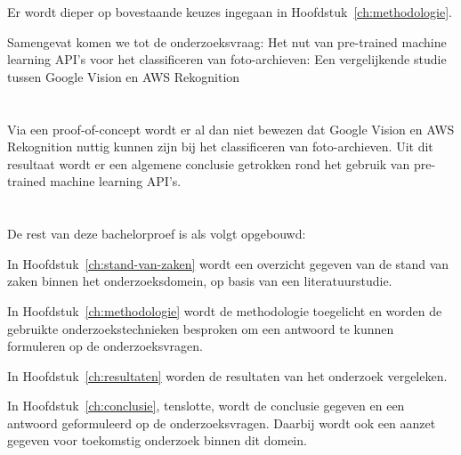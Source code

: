 Er wordt dieper op bovestaande keuzes ingegaan in Hoofdstuk~\ref{ch:methodologie}.

Samengevat komen we tot de onderzoeksvraag: Het nut van pre-trained machine learning API's voor het classificeren van foto-archieven: Een vergelijkende studie tussen Google Vision en AWS Rekognition

\section{}
\label{sec:onderzoeksdoelstelling}

Via een proof-of-concept wordt er al dan niet bewezen dat Google Vision en AWS Rekognition nuttig kunnen zijn bij het classificeren van foto-archieven. Uit dit resultaat wordt er een algemene conclusie getrokken rond het gebruik van pre-trained machine learning API's.

\section{}
\label{sec:opzet-bachelorproef}


De rest van deze bachelorproef is als volgt opgebouwd:

In Hoofdstuk~\ref{ch:stand-van-zaken} wordt een overzicht gegeven van de stand van zaken binnen het onderzoeksdomein, op basis van een literatuurstudie.

In Hoofdstuk~\ref{ch:methodologie} wordt de methodologie toegelicht en worden de gebruikte onderzoekstechnieken besproken om een antwoord te kunnen formuleren op de onderzoeksvragen.

In Hoofdstuk~\ref{ch:resultaten} worden de resultaten van het onderzoek vergeleken.


In Hoofdstuk~\ref{ch:conclusie}, tenslotte, wordt de conclusie gegeven en een antwoord geformuleerd op de onderzoeksvragen. Daarbij wordt ook een aanzet gegeven voor toekomstig onderzoek binnen dit domein.